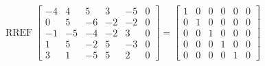 \begin{exerciseAnswer} 


\[\operatorname{RREF} \left[\begin{array}{ccccc|c}
-4 & 4 & 5 & 3 & -5 & 0 \\
0 & 5 & -6 & -2 & -2 & 0 \\
-1 & -5 & -4 & -2 & 3 & 0 \\
1 & 5 & -2 & 5 & -3 & 0 \\
3 & 1 & -5 & 5 & 2 & 0
\end{array}\right] = \left[\begin{array}{ccccc|c}
1 & 0 & 0 & 0 & 0 & 0 \\
0 & 1 & 0 & 0 & 0 & 0 \\
0 & 0 & 1 & 0 & 0 & 0 \\
0 & 0 & 0 & 1 & 0 & 0 \\
0 & 0 & 0 & 0 & 1 & 0
\end{array}\right] \]



\end{exerciseAnswer}
